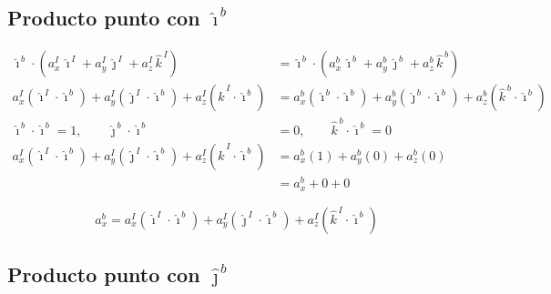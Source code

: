 \documentclass[11pt,a4paper]{article}
\begin{document}
\subsection*{Producto punto con $\hat{\imath}^{\,b}$}

\begin{align}
  \hat{\imath}^{\,b}\cdot\left( a_x^{I}\,\hat{\imath}^{\,I} + a_y^{I}\,\hat{\jmath}^{\,I} + a_z^{I}\,\hat{k}^{\,I} \right)
  &= \hat{\imath}^{\,b}\cdot\left( a_x^{b}\,\hat{\imath}^{\,b} + a_y^{b}\,\hat{\jmath}^{\,b} + a_z^{b}\,\hat{k}^{\,b} \right) \\[6pt]
  a_x^{I}\left(\hat{\imath}^{\,I}\cdot\hat{\imath}^{\,b}\right)
  + a_y^{I}\left(\hat{\jmath}^{\,I}\cdot\hat{\imath}^{\,b}\right)
  + a_z^{I}\left(\hat{k}^{\,I}\cdot\hat{\imath}^{\,b}\right)
  &= a_x^{b}\left(\hat{\imath}^{\,b}\cdot\hat{\imath}^{\,b}\right)
  + a_y^{b}\left(\hat{\jmath}^{\,b}\cdot\hat{\imath}^{\,b}\right)
  + a_z^{b}\left(\hat{k}^{\,b}\cdot\hat{\imath}^{\,b}\right) \\[6pt]
  \hat{\imath}^{\,b}\cdot\hat{\imath}^{\,b} = 1, \qquad
  \hat{\jmath}^{\,b}\cdot\hat{\imath}^{\,b} &= 0, \qquad
  \hat{k}^{\,b}\cdot\hat{\imath}^{\,b} = 0 \\[6pt]
  a_x^{I}\left(\hat{\imath}^{\,I}\cdot\hat{\imath}^{\,b}\right)
  + a_y^{I}\left(\hat{\jmath}^{\,I}\cdot\hat{\imath}^{\,b}\right)
  + a_z^{I}\left(\hat{k}^{\,I}\cdot\hat{\imath}^{\,b}\right)
  &= a_x^{b}(1) + a_y^{b}(0) + a_z^{b}(0) \\[6pt]
  &= a_x^{b} + 0 + 0
\end{align}

\begin{equation}
  \boxed{\;a_x^{b} = a_x^{I}\left(\hat{\imath}^{\,I}\cdot\hat{\imath}^{\,b}\right)
  + a_y^{I}\left(\hat{\jmath}^{\,I}\cdot\hat{\imath}^{\,b}\right)
  + a_z^{I}\left(\hat{k}^{\,I}\cdot\hat{\imath}^{\,b}\right)\;}
\end{equation}

\subsection*{Producto punto con $\hat{\jmath}^{\,b}$}
\end{document}

